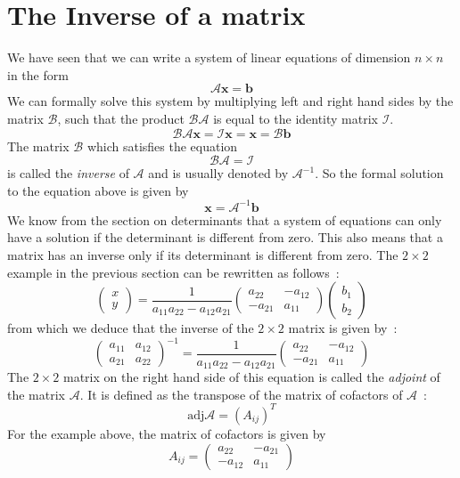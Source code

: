 \section{The Inverse of a matrix}\label{\chabbr:sec:inverse}

We have seen that we can write a system of linear equations of dimension $n\times n$ in the form
\[
\mathcal{A}\mathbf{x}=\mathbf{b}
\]
We can formally solve this system by multiplying left and right hand sides by the matrix $\mathcal{B}$, such
that the product $\mathcal{BA}$ is equal to the identity matrix $\mathcal{I}$.
\[
\mathcal{BA}\mathbf{x}=\mathcal{I}\mathbf{x}=\mathbf{x}=\mathcal{B}\mathbf{b}
\]
The matrix $\mathcal{B}$ which satisfies the equation
\[
\mathcal{BA}=\mathcal{I}
\]
is called the \textit{inverse} of $\mathcal{A}$ and is usually denoted by $\mathcal{A}^{-1}$.
So the formal solution to the equation above is given by
\[
\mathbf{x}=\mathcal{A}^{-1}\mathbf{b}
\]
We know from the section on determinants that a system of equations can only have a solution if the 
determinant is different from zero.  This also means that a matrix has an inverse only if its determinant 
is different from zero.  The $2\times 2$ example in the previous section can be rewritten as follows~:
\[
\begin{pmatrix}x\\ y\end{pmatrix}=\frac{1}{a_{11}a_{22}-a_{12}a_{21}}\begin{pmatrix}a_{22}&-a_{12}\\ -a_{21}&a_{11}\end{pmatrix}\begin{pmatrix}b_1\\ b_2\end{pmatrix}
\]
from which we deduce that the inverse of the $2\times 2$ matrix is given by~:
\[
\begin{pmatrix}a_{11}&a_{12}\\ a_{21}&a_{22}\end{pmatrix}^{-1}=\frac{1}{a_{11}a_{22}-a_{12}a_{21}}\begin{pmatrix}a_{22}&-a_{12}\\ -a_{21}&a_{11}\end{pmatrix}
\]
The $2\times 2$ matrix on the right hand side of this equation is called the \textit{adjoint} of the matrix $\mathcal{A}$.
It is defined as the transpose of the matrix of cofactors of $\mathcal{A}$~:
\[
\mbox{adj}\mathcal{A}=(A_{ij})^{T}
\]
For the example above, the matrix of cofactors is given by
\[
A_{ij}=\begin{pmatrix}a_{22}&-a_{21}\\ -a_{12}&a_{11}\end{pmatrix}
\]
